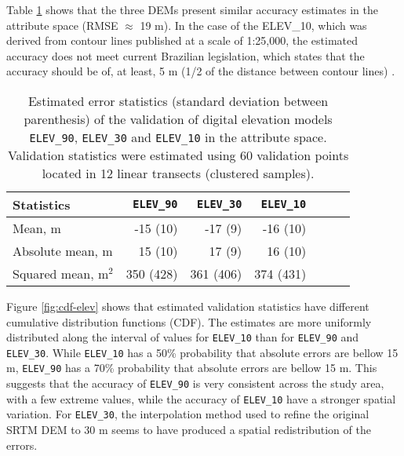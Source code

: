 Table \ref{tab:dem-attr-val} shows that the three DEMs present similar accuracy estimates in the attribute space (RMSE $\approx$ 19 m). In the case of the ELEV\_10, which was derived from contour lines published at a scale of 1:25,000, the estimated accuracy does not meet current Brazilian legislation, which states that the accuracy should be of, at least, 5 m (1/2 of the distance between contour lines) \citep{Brasil1984}.
 
\begin{table}[ht]
  \caption{Estimated error statistics (standard deviation between parenthesis) of the validation of digital elevation models \texttt{ELEV\_90}, \texttt{ELEV\_30} and \texttt{ELEV\_10} in the attribute space. Validation statistics were estimated using 60 validation points located in 12 linear transects (clustered samples).}
  \label{tab:dem-attr-val}
  \centering
  {\small
  \begin{tabular}{lrrrrrr}
    \hline
    Statistics           & \texttt{ELEV\_90} & \texttt{ELEV\_30} & \texttt{ELEV\_10} \\
    \hline
    Mean, m              & -15 (10)          & -17 (9)           & -16 (10)          \\ 
    Absolute mean, m     & 15  (10)          & 17  (9)           & 16  (10)          \\ 
    Squared mean, m$^2$  & 350 (428)         & 361 (406)         & 374 (431)         \\ 
    \hline
  \end{tabular}}
\end{table}

Figure \ref{fig:cdf-elev} shows that estimated validation statistics have different cumulative distribution functions (CDF). The estimates are more uniformly distributed along the interval of values for \texttt{ELEV\_10} than for \texttt{ELEV\_90} and \texttt{ELEV\_30}. While \texttt{ELEV\_10} has a 50\% probability that absolute errors are bellow 15 m, \texttt{ELEV\_90} has a 70\% probability that absolute errors are bellow 15 m. This suggests that the accuracy of \texttt{ELEV\_90} is very consistent across the study area, with a few extreme values, while the accuracy of \texttt{ELEV\_10} have a stronger spatial variation. For \texttt{ELEV\_30}, the interpolation method used to refine the original SRTM DEM to 30 m \citep{ValerianoEtAl2012} seems to have produced a spatial redistribution of the errors.


